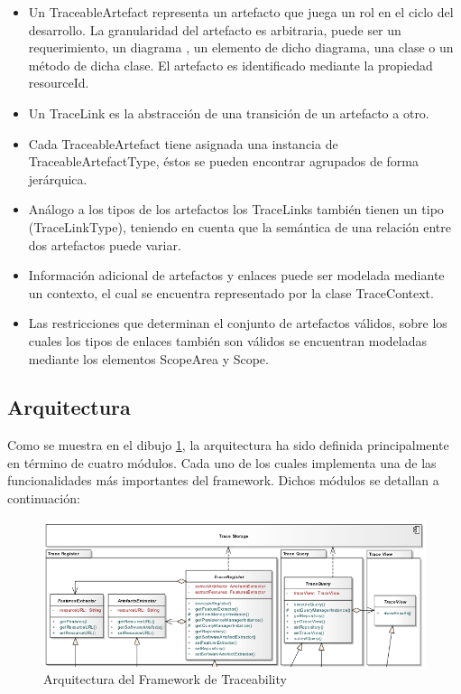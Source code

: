 \documentclass[a4paper,12pt,oneside,spanish]{book}
\begin{document}
\begin{itemize}
\item Un \textsf{TraceableArtefact} representa un artefacto que juega un rol en el ciclo del desarrollo. La granularidad del artefacto es arbitraria, puede ser un requerimiento, un diagrama , un elemento de dicho diagrama, una clase o un método de dicha clase. El artefacto es identificado mediante la propiedad \textsf{resourceId}.
\item Un \textsf{TraceLink} es la abstracción de una transición de un artefacto a otro.
\item Cada \textsf{TraceableArtefact} tiene asignada una instancia de \textsf{TraceableArtefactType}, éstos se pueden encontrar agrupados de forma jerárquica.
 \item Análogo a los tipos de los artefactos los \textsf{TraceLinks} también tienen un tipo (\textsf{TraceLinkType}), teniendo en cuenta que la semántica de una relación entre dos artefactos puede variar.
\item Información adicional de artefactos y enlaces puede ser modelada mediante un contexto, el cual se encuentra representado por la clase \textsf{TraceContext}.
\item Las restricciones que determinan el conjunto de artefactos válidos, sobre los cuales los tipos de enlaces también son válidos se encuentran modeladas mediante los elementos \textsf{ScopeArea} y \textsf{Scope}.
\end{itemize}

\subsection{Arquitectura}

Como se muestra en el dibujo \ref{fig:SPLArquitectura}, la arquitectura ha sido definida principalmente en término de cuatro módulos. Cada uno de los cuales implementa una de las funcionalidades más importantes del framework. Dichos módulos se detallan a continuación:

\begin{figure}[hbtp]
\centering
\includegraphics[scale=.55]{./img/ArquitecturaTraceabilityFramework}
\caption{Arquitectura del Framework de Traceability}
\label{fig:SPLArquitectura}
\end{figure}
\end{document}
